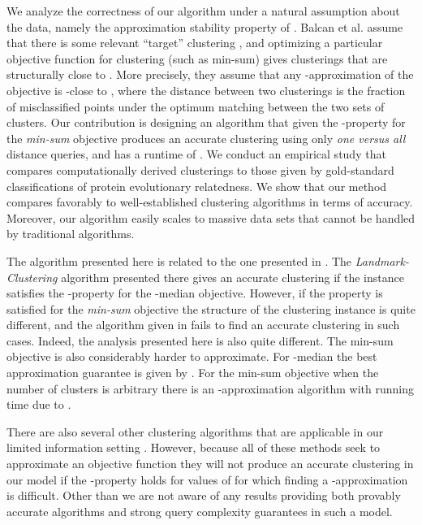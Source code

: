 \documentclass{llncs} \usepackage{algorithm}
\begin{document}
We analyze the correctness of our algorithm under a natural assumption about the data, namely the  approximation stability property of \cite{bbg}.  Balcan et al. assume that there is some relevant ``target'' clustering , and optimizing a particular objective function for clustering (such as min-sum) gives clusterings that are structurally close to .  More precisely, they assume that any -approximation of the objective is -close to , where the distance between two clusterings is the fraction of misclassified points under the optimum matching between the two sets of clusters.  Our contribution is designing an algorithm that given the -property for the \emph{min-sum} objective produces an accurate clustering using only  \emph{one versus all} distance queries, and has a runtime of .  We conduct an empirical study that compares computationally derived clusterings to those given by gold-standard classifications of protein evolutionary relatedness.  We show that our method compares favorably to well-established clustering algorithms in terms of accuracy.  Moreover, our algorithm easily scales to massive data sets that cannot be handled by traditional algorithms.

The algorithm presented here is related to the one presented in \cite{vbrtx}.  The \emph{Landmark-Clustering} algorithm presented there gives an accurate clustering if the instance satisfies the -property for the -median objective.  However, if the property is satisfied for the \emph{min-sum} objective the structure of the clustering instance is quite different, and the algorithm given in \cite{vbrtx} fails to find an accurate clustering in such cases.  Indeed, the analysis presented here is also quite different.  The min-sum objective is also considerably harder to approximate.  For -median the best approximation guarantee is  given by \cite{kMedApprox}.  For the min-sum objective when the number of clusters is arbitrary there is an -approximation algorithm with running time  due to \cite{bcr}.

There are also several other clustering algorithms that are applicable in our limited information setting \cite{av,ajm,sampleBasedClustering,sampleBasedClustering3}.  However, because all of these methods seek to approximate an objective function they will not produce an accurate clustering in our model if the -property holds for values of  for which finding a -approximation is difficult.  Other than \cite{vbrtx} we are not aware of any results providing both provably accurate algorithms and strong query complexity guarantees in such a model.
\end{document}

